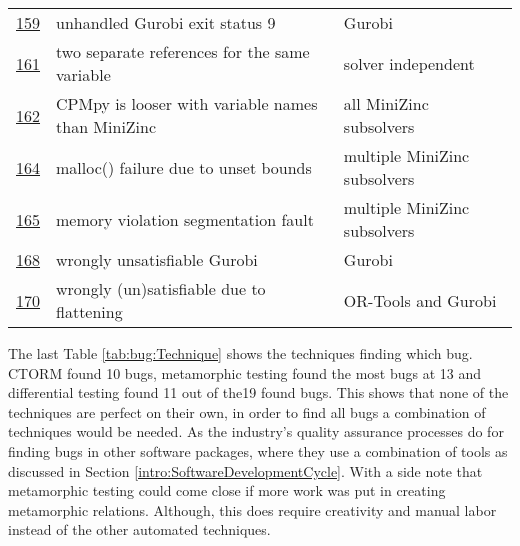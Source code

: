 \begin{table}[]
\begin{tabular}{lll}
		\href{https://github.com/CPMpy/cpmpy/issues/159}{159} & unhandled Gurobi exit status 9                    & Gurobi                       \\
		\href{https://github.com/CPMpy/cpmpy/issues/161}{161} & two separate references for the same variable     & solver independent           \\
		\href{https://github.com/CPMpy/cpmpy/issues/162}{162} & CPMpy is looser with variable names than MiniZinc & all MiniZinc subsolvers      \\
		\href{https://github.com/CPMpy/cpmpy/issues/164}{164} & malloc() failure due to unset bounds              & multiple MiniZinc subsolvers \\
		\href{https://github.com/CPMpy/cpmpy/issues/165}{165} & memory violation segmentation fault               & multiple MiniZinc subsolvers \\
		\href{https://github.com/CPMpy/cpmpy/issues/168}{168} & wrongly unsatisfiable Gurobi                      & Gurobi                       \\
		\href{https://github.com/CPMpy/cpmpy/issues/170}{170} & wrongly (un)satisfiable due to flattening         & OR-Tools and Gurobi          \\ \bottomrule
	\end{tabular}
\end{table}

\label{res:TechniqueToFindBug}
The last Table \ref{tab:bug:Technique} shows the techniques finding which bug. CTORM found 10 bugs, metamorphic testing found the most bugs at 13 and differential testing found 11 out of the19 found bugs. This shows that none of the techniques are perfect on their own, in order to find all bugs a combination of techniques would be needed. As the industry’s quality assurance processes do for finding bugs in other software packages, where they use a combination of tools as discussed in Section \ref{intro:SoftwareDevelopmentCycle}. With a side note that metamorphic testing could come close if more work was put in creating metamorphic relations. Although, this does require creativity and manual labor instead of the other automated techniques.

